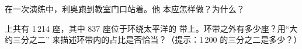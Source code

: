 \begin{exercise}[$\star\star$]\label{exo:g4:volcanoes-earthquakes-first-look:10}
在一次演练中，利奥跑到教室门口站着。他
本应怎样做？为什么？
\end{exercise}

\begin{exercise}[$\star\star\star$]\label{exo:g4:volcanoes-earthquakes-first-look:11}
上共有 1\,214 座，其中 837 座位于环绕太平洋的
带上。环带之外有多少座？用“大约三分之二”
来描述环带内的占比是否恰当？（提示：1\,200 的三分之二是多少？）
\end{exercise}
